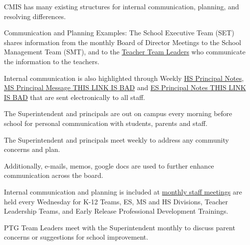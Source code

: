 

\begin{findings}

CMIS has many existing structures for internal communication, planning, and resolving differences.

Communication and Planning Examples:
The School Executive Team (SET) shares information from the monthly Board of Director Meetings to the School Management Team (SMT), and to the \href{https://docs.google.com/a/cmis.ac.th/document/d/1iW_tWIwRlWU2p0oIOvd3usDsxj9qYDt_2ROwNPBTHSc/edit?usp=sharing}{Teacher Team Leaders} who communicate the information to the teachers.

Internal communication is also highlighted through Weekly \href{https://docs.google.com/a/cmis.ac.th/document/d/1Jh_VpJ8rfb4_OwmpRw6VZCrIYAuV6A0SP_3NN82KD7A/edit?usp=sharing}{HS Principal Notes}, \href{https://mail.google.com/mail/u/0/#search/tstinchcomb\%40cmis.ac.th/15a1132a902382f6?projector=1}{MS Principal Message THIS LINK IS BAD} and \href{https://mail.google.com/mail/u/0/#search/tstinchcomb\%40cmis.ac.th+\%3A+label\%3Aprincipal-message/15740791ba27a316}{ES Principal Notes THIS LINK IS BAD} that are sent electronically to all staff.

The Superintendent and principals are out on campus every morning before school for personal communication with students, parents and staff.

The Superintendent and principals meet weekly to address any community concerns and plan.

Additionally, e-mails, memos, google docs are used to further enhance communication across the board.


Internal communication and planning is included at \href{https://docs.google.com/a/cmis.ac.th/document/d/1tSEBD59kwf83Z0-m1Q4hzNrVwaJMHdracrghwqoSdW0/edit?usp=sharing}{monthly staff meetings} are held every Wednesday for K-12 Teams, ES, MS and HS Divisions, Teacher Leadership Teams, and Early Release Professional Development Trainings.

PTG Team Leaders meet with the Superintendent monthly to discuss parent concerns or suggestions for school improvement.


\end{findings}
